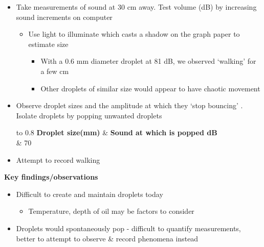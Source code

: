 \begin{itemize}
\item Take measurements of sound at 30 cm away. Test volume (dB) by increasing sound increments on computer

\begin{itemize}
\item Use light to illuminate which casts a shadow on the graph paper to estimate size

\begin{itemize}
\item With a 0.6 mm diameter droplet at 81 dB, we observed `walking' for a few cm
\item Other droplets of similar size would appear to have chaotic movement
\end{itemize}
\end{itemize}
\item Observe droplet sizes and the amplitude at which they `stop bouncing' . Isolate droplets by popping unwanted droplets
\bigskip
\begin{center}
\begin{tabu} to 0.8\textwidth { | X[c] | X[c] | }
 \hline
 \textbf{Droplet size(mm)} & \textbf{Sound at which is popped dB}  \\
   & 70    \\
\hline
\end{tabu}
\end{center}
\bigskip
\end{itemize}

\begin{itemize}
\item Attempt to record walking
\end{itemize}
\bigskip



\textbf{Key findings/observations}

\begin{itemize}
\item Difficult to create and maintain droplets today

\begin{itemize}
\item Temperature, depth of oil may be factors to consider
\end{itemize}
\item Droplets would spontaneously pop - difficult to quantify measurements, better to attempt to observe \& record phenomena instead
\end{itemize}
\bigskip


